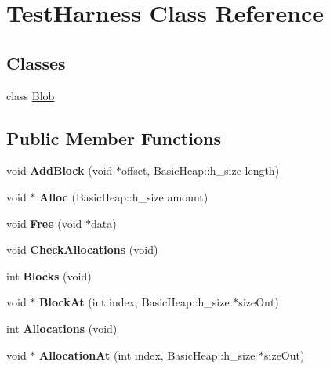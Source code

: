 \hypertarget{class_test_harness}{}\section{Test\+Harness Class Reference}
\label{class_test_harness}
\subsection*{Classes}
\begin{DoxyCompactItemize}
\item 
class \hyperlink{class_test_harness_1_1_blob}{Blob}
\end{DoxyCompactItemize}
\subsection*{Public Member Functions}
\begin{DoxyCompactItemize}
\item 
\mbox{\label{class_test_harness_a5deb6134d5c13345ece566907d38bd19}} 
void {\bfseries Add\+Block} (void $\ast$offset, Basic\+Heap\+::h\+\_\+size length)
\item 
\mbox{\label{class_test_harness_a5c6e86b6e497c3f3b26c036661f0f3b1}} 
void $\ast$ {\bfseries Alloc} (Basic\+Heap\+::h\+\_\+size amount)
\item 
\mbox{\label{class_test_harness_a5357a840da867afbed197430fd342a54}} 
void {\bfseries Free} (void $\ast$data)
\item 
\mbox{\label{class_test_harness_a66125b2e168907a3acf5e59816fc4beb}} 
void {\bfseries Check\+Allocations} (void)
\item 
\mbox{\label{class_test_harness_a5aff3afc1de3b7e64e56f44016ba995d}} 
int {\bfseries Blocks} (void)
\item 
\mbox{\label{class_test_harness_a6c3b9bab233714629ab4692cf6f05987}} 
void $\ast$ {\bfseries Block\+At} (int index, Basic\+Heap\+::h\+\_\+size $\ast$size\+Out)
\item 
\mbox{\label{class_test_harness_a42403aa935653b9e9b9757accc92fdd9}} 
int {\bfseries Allocations} (void)
\item 
\mbox{\label{class_test_harness_a7aed445247cc2e5f5181961c683aa273}} 
void $\ast$ {\bfseries Allocation\+At} (int index, Basic\+Heap\+::h\+\_\+size $\ast$size\+Out)
\end{DoxyCompactItemize}
